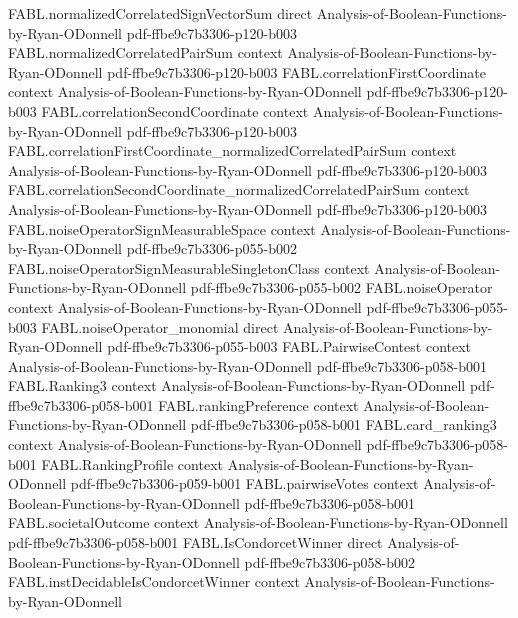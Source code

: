 \begin{theorem}
\proofstep
  {FABL.normalizedCorrelatedSignVectorSum}
  {direct}
  {Analysis-of-Boolean-Functions-by-Ryan-ODonnell}
  {pdf-ffbe9c7b3306-p120-b003}
\proofstep
  {FABL.normalizedCorrelatedPairSum}
  {context}
  {Analysis-of-Boolean-Functions-by-Ryan-ODonnell}
  {pdf-ffbe9c7b3306-p120-b003}
\proofstep
  {FABL.correlationFirstCoordinate}
  {context}
  {Analysis-of-Boolean-Functions-by-Ryan-ODonnell}
  {pdf-ffbe9c7b3306-p120-b003}
\proofstep
  {FABL.correlationSecondCoordinate}
  {context}
  {Analysis-of-Boolean-Functions-by-Ryan-ODonnell}
  {pdf-ffbe9c7b3306-p120-b003}
\proofstep
  {FABL.correlationFirstCoordinate_normalizedCorrelatedPairSum}
  {context}
  {Analysis-of-Boolean-Functions-by-Ryan-ODonnell}
  {pdf-ffbe9c7b3306-p120-b003}
\proofstep
  {FABL.correlationSecondCoordinate_normalizedCorrelatedPairSum}
  {context}
  {Analysis-of-Boolean-Functions-by-Ryan-ODonnell}
  {pdf-ffbe9c7b3306-p120-b003}
\proofstep
  {FABL.noiseOperatorSignMeasurableSpace}
  {context}
  {Analysis-of-Boolean-Functions-by-Ryan-ODonnell}
  {pdf-ffbe9c7b3306-p055-b002}
\proofstep
  {FABL.noiseOperatorSignMeasurableSingletonClass}
  {context}
  {Analysis-of-Boolean-Functions-by-Ryan-ODonnell}
  {pdf-ffbe9c7b3306-p055-b002}
\proofstep
  {FABL.noiseOperator}
  {context}
  {Analysis-of-Boolean-Functions-by-Ryan-ODonnell}
  {pdf-ffbe9c7b3306-p055-b003}
\proofstep
  {FABL.noiseOperator_monomial}
  {direct}
  {Analysis-of-Boolean-Functions-by-Ryan-ODonnell}
  {pdf-ffbe9c7b3306-p055-b003}
\proofstep
  {FABL.PairwiseContest}
  {context}
  {Analysis-of-Boolean-Functions-by-Ryan-ODonnell}
  {pdf-ffbe9c7b3306-p058-b001}
\proofstep
  {FABL.Ranking3}
  {context}
  {Analysis-of-Boolean-Functions-by-Ryan-ODonnell}
  {pdf-ffbe9c7b3306-p058-b001}
\proofstep
  {FABL.rankingPreference}
  {context}
  {Analysis-of-Boolean-Functions-by-Ryan-ODonnell}
  {pdf-ffbe9c7b3306-p058-b001}
\proofstep
  {FABL.card_ranking3}
  {context}
  {Analysis-of-Boolean-Functions-by-Ryan-ODonnell}
  {pdf-ffbe9c7b3306-p058-b001}
\proofstep
  {FABL.RankingProfile}
  {context}
  {Analysis-of-Boolean-Functions-by-Ryan-ODonnell}
  {pdf-ffbe9c7b3306-p059-b001}
\proofstep
  {FABL.pairwiseVotes}
  {context}
  {Analysis-of-Boolean-Functions-by-Ryan-ODonnell}
  {pdf-ffbe9c7b3306-p058-b001}
\proofstep
  {FABL.societalOutcome}
  {context}
  {Analysis-of-Boolean-Functions-by-Ryan-ODonnell}
  {pdf-ffbe9c7b3306-p058-b001}
\proofstep
  {FABL.IsCondorcetWinner}
  {direct}
  {Analysis-of-Boolean-Functions-by-Ryan-ODonnell}
  {pdf-ffbe9c7b3306-p058-b002}
\proofstep
  {FABL.instDecidableIsCondorcetWinner}
  {context}
  {Analysis-of-Boolean-Functions-by-Ryan-ODonnell}

\end{theorem}
